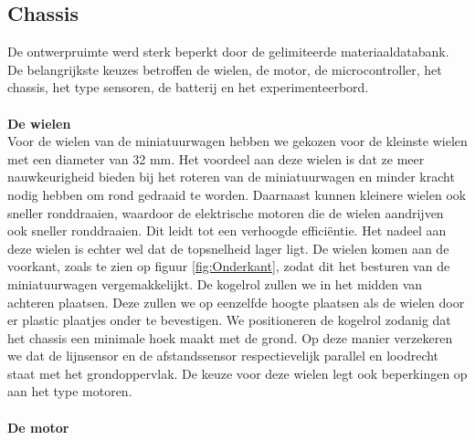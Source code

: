 \documentclass[a4paper,kulak]{kulakarticle}
\begin{document}
\subsection{Chassis}
De ontwerpruimte werd sterk beperkt door de gelimiteerde materiaaldatabank. De belangrijkste keuzes betroffen de wielen, de motor, de microcontroller, het chassis, het type sensoren, de batterij en het experimenteerbord.
\\\\ \textbf{\large De wielen} \\
Voor de wielen van de miniatuurwagen hebben we gekozen voor de kleinste wielen met een diameter van 32 mm. Het voordeel aan deze wielen is dat ze meer nauwkeurigheid bieden bij het roteren van de miniatuurwagen en minder kracht nodig hebben om rond gedraaid te worden. Daarnaast kunnen kleinere wielen ook sneller ronddraaien, waardoor de elektrische motoren die de wielen aandrijven ook sneller ronddraaien. Dit leidt tot een verhoogde efficiëntie. Het nadeel aan deze wielen is echter wel dat de topsnelheid lager ligt. De wielen komen aan de voorkant, zoals te zien op figuur \ref{fig:Onderkant}, zodat dit het besturen van de miniatuurwagen vergemakkelijkt. De kogelrol zullen we in het midden van achteren plaatsen. Deze zullen we op eenzelfde hoogte plaatsen als de wielen door er plastic plaatjes onder te bevestigen. We positioneren de kogelrol zodanig dat het chassis een minimale hoek maakt met de grond. Op deze manier verzekeren we dat de lijnsensor en de afstandssensor respectievelijk parallel en loodrecht staat met het grondoppervlak. De keuze voor deze wielen legt ook beperkingen op aan het type motoren.
\\\\ \textbf{\large De motor}
\end{document}
